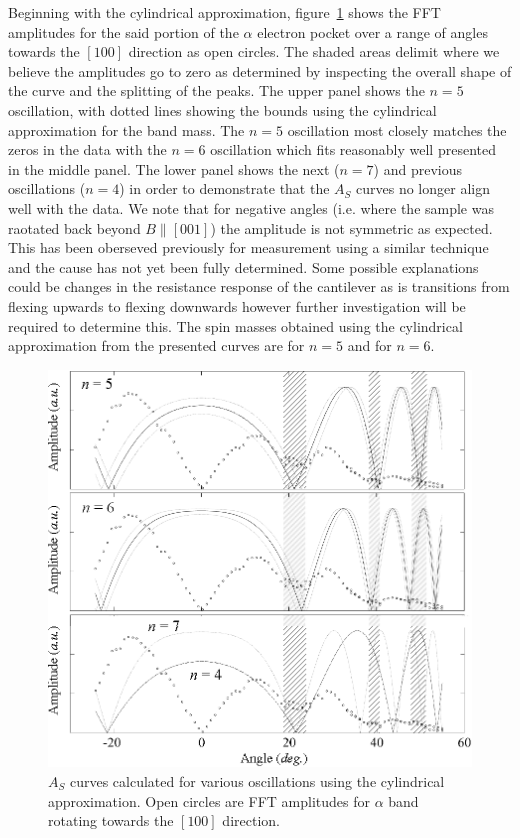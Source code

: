 Beginning with the cylindrical approximation, figure~\ref{Fig:ResD:Band4SpinMassCylindrical} shows the \ac{FFT} amplitudes for the said portion of the $\alpha$ electron pocket over a range of angles towards the $[100]$ direction as open circles. The shaded areas delimit where we believe the amplitudes go to zero as determined by inspecting the overall shape of the curve and the splitting of the peaks. The upper panel shows the $n=5$ oscillation, with dotted lines showing the bounds using the cylindrical approximation for the band mass. The $n=5$ oscillation most closely matches the zeros in the data with the $n=6$ oscillation which fits reasonably well presented in the middle panel. The lower panel shows the next ($n=7$) and previous oscillations ($n=4$) in order to demonstrate that the $A_S$ curves no longer align well with the data. We note that for negative angles (i.e. where the sample was raotated back beyond $B\parallel[001]$) the amplitude is not symmetric as expected. This has been oberseved previously for measurement using a similar technique\cite{Rourke2010b} and the cause has not yet been fully determined. Some possible explanations could be changes in the resistance response of the cantilever as is transitions from flexing upwards to flexing downwards however further investigation will be required to determine this. The spin masses obtained using the cylindrical approximation from the presented curves are  for $n=5$ and  for $n=6$.
\begin{figure}[htbp]
    \begin{center}
        \includegraphics[scale=0.75]{Chapter-dHvABaFe2P2/Figures/Mass/SpinMassBand4Cylindrical/SpinMassBand4Cylindrical}
        \caption{$A_S$ curves calculated for various oscillations using the cylindrical approximation. Open circles are \ac{FFT} amplitudes for $\alpha$ band rotating towards the $[100]$ direction.}
        \label{Fig:ResD:Band4SpinMassCylindrical}
    \end{center}
\end{figure}
